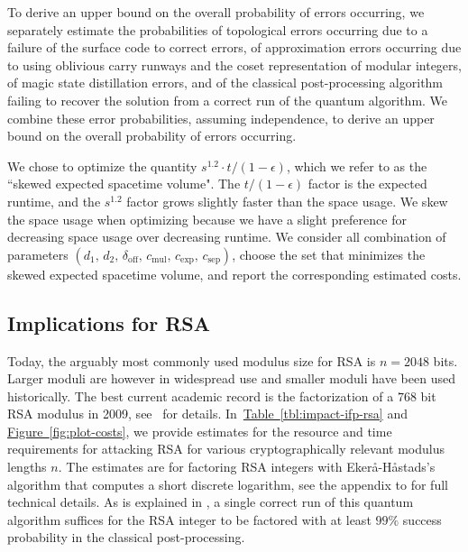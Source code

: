 \documentclass[superscriptaddress,notitlepage,longbibliography]{revtex4-1}
\theoremstyle{definition}
\theoremstyle{definition}
\newcommand{\fig}[1]{\hyperref[fig:#1]{Figure~\ref*{fig:#1}}}
\newcommand{\tbl}[1]{\hyperref[tbl:#1]{Table~\ref*{tbl:#1}}}
\newcommand{\devoff}{{\delta_{\text{off}}}}
\newcommand{\gexp}{{c_{\text{exp}}}}
\newcommand{\gmul}{{c_{\text{mul}}}}
\newcommand{\gsep}{{c_{\text{sep}}}}
\newcommand{\distone}{{d_1}}
\newcommand{\disttwo}{{d_2}}
\begin{document}
To derive an upper bound on the overall probability of errors occurring, we separately estimate the probabilities
  of topological errors occurring due to a failure of the surface code to correct errors,
  of approximation errors occurring due to using oblivious carry runways and the coset representation of modular integers,
  of magic state distillation errors,
  and of the classical post-processing algorithm failing to recover the solution from a correct run of the quantum algorithm.
We combine these error probabilities, assuming independence, to derive an upper bound on the overall probability of errors occurring.

We chose to optimize the quantity $s^{1.2} \cdot t / (1 - \epsilon)$, which we refer to as the ``skewed expected spacetime volume".
The $t / (1 - \epsilon)$ factor is the expected runtime, and the $s^{1.2}$ factor grows slightly faster than the space usage.
We skew the space usage when optimizing because we have a slight preference for decreasing space usage over decreasing runtime.
We consider all combination of parameters $(\distone, \, \disttwo, \, \devoff, \, \gmul, \, \gexp, \, \gsep)$, choose the set that minimizes the skewed expected spacetime volume, and report the corresponding estimated costs.

\subsection{Implications for RSA}
Today, the arguably most commonly used modulus size for RSA is $n=2048$ bits. Larger moduli are however in widespread use and smaller moduli have been used historically. The best current academic record is the factorization of a $768$ bit RSA modulus in 2009, see~\cite{kleinjung-rsa768} for details. In~\tbl{impact-ifp-rsa} and \fig{plot-costs}, we provide estimates for the resource and time requirements for attacking RSA for various cryptographically relevant modulus lengths $n$. The estimates are for factoring RSA integers with Ekerå-Håstads's algorithm \cite{ekeraa2017quantum,  ekeraa2017pp} that computes a short discrete logarithm, see the appendix to \cite{ekeraa2017pp} for full technical details. As is explained in \cite{ekeraa2017pp}, a single correct run of this quantum algorithm suffices for the RSA integer to be factored with at least $99\%$ success probability in the classical post-processing.
\end{document}
